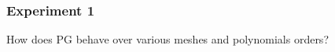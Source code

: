 \documentclass[aspectratio=169,xcolor=dvipsnames,11pt]{beamer}
\begin{document}




\begin{frame}\frametitle{Experiment 1}
\begin{center}
{\color{Maroon} \Large How does PG behave over various meshes and polynomials orders?}
\end{center}
\end{frame}
\end{document}
